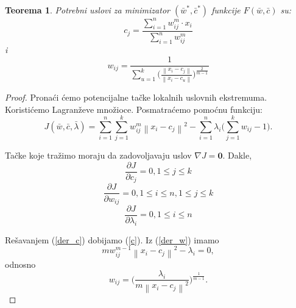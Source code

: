 \documentclass[12pt,a4paper]{article}
\newtheorem{thm}{Teorema}[section]
\theoremstyle{definition}
\theoremstyle{remark}
\theoremstyle{plain}
\begin{document}
\begin{thm}
  Potrebni uslovi za minimizator $(\bar{w}^{*}, \bar{c}^{*})$ funkcije $F(\bar{w}, \bar{c})$ su:
  \begin{equation}\label{c}
    c_{j} = \frac{\sum\limits_{i=1}^{n} w_{ij}^m \cdot x_{i}}{\sum\limits_{i=1}^{n} w_{ij}^{m}}
  \end{equation}
  i
  \begin{equation}\label{w}
    w_{ij} = \frac{1}{\sum\limits_{u=1}^{k} \biggl(\frac{\left\|x_{i}-c_{j}\right\|}{\left\|x_{i}-c_{u}\right\|}\biggr)^{\frac{2}{m-1}}} 
  \end{equation}
\end{thm}
\begin{proof}
Prona\' ci \' cemo potencijalne ta\v cke lokalnih uslovnih ekstremuma. Koristi\' cemo Lagran\v zeve mno\v zioce. Posmatra\' cemo pomo\' cnu funkciju:
\begin{equation*}
  J(\bar{w}, \bar{c}, \bar{\lambda}) = \sum_{i=1}^{n}\sum_{j=1}^{k}w_{ij}^{m}\left\|x_{i}-c_{j}\right\|^{2} - \sum_{i=1}^{n}\lambda_{i}\biggl(\sum_{j=1}^{k}w_{ij}-1\biggr).
\end{equation*}

Ta\v cke koje tra\v zimo moraju da zadovoljavaju uslov $\nabla J=\textbf{0}$. Dakle,
  \begin{equation}\label{der_c}
  \frac{\partial J}{\partial c_{j}} = 0, 1\leq j \leq k
\end{equation}
  \begin{equation}\label{der_w}
  \frac{\partial J}{\partial w_{ij}} = 0, 1\leq i \leq n, 1\leq j \leq k 
\end{equation}
\begin{equation}\label{der_l}
  \frac{\partial J}{\partial \lambda_{i}} = 0, 1\leq i \leq n 
\end{equation}

  Re\v savanjem (\ref{der_c}) dobijamo (\ref{c}). Iz (\ref{der_w}) imamo
\begin{equation*}
  mw_{ij}^{m-1}\left\|x_{i}-c_{j}\right\|^{2} - \lambda_{i} = 0,
\end{equation*}
odnosno
\begin{equation}\label{wij}
  w_{ij} = \biggl(\frac{\lambda_{i}}{m\left\|x_{i}-c_{j}\right\|^{2}}\biggr)^{\frac{1}{m-1}}.
\end{equation}


\end{proof}
\end{document}
